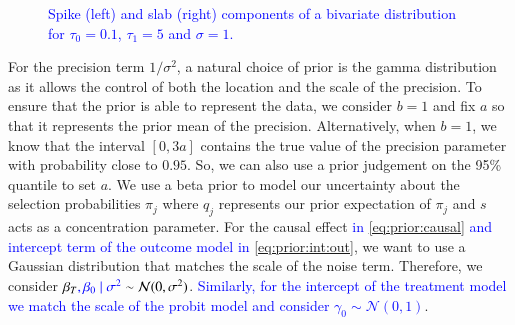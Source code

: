 \documentclass[preprint,12pt]{elsarticle}
\newcommand{\normal}{\mathcal{N}}
\newcommand{\added}[1]{\textcolor{blue}{#1}}
\begin{document}
\begin{figure}[h]
	\begin{center}
\qquad
{}
	\end{center}
	\caption{\added{Spike (left) and slab (right) components of a bivariate distribution for $\tau_0 = 0.1$, $\tau_1 = 5$ and $\sigma=1$.}}
	\label{fig:ssbl}
\end{figure}

For the precision term $1/\sigma^2$, a natural choice of prior is the gamma distribution
as it allows the control of both the location and the scale of the precision.
To ensure that the prior is able to represent the data, we consider $b=1$ and 
fix $a$ so that it represents the prior mean of the precision.
Alternatively, when $b=1$, we know that the interval
$[0, 3a]$ contains the true value of the precision parameter with probability close to $0.95$.
So, we can also use a prior judgement on the 95\% quantile to set $a$.
We use a beta prior to
model our uncertainty about
the selection probabilities $\pi_j$ where  $q_j$ represents our prior expectation of $\pi_j$ and $s$ acts as 
a concentration parameter.
For the causal effect \added{in \cref{eq:prior:causal} and intercept term of the outcome model in \cref{eq:prior:int:out}}, we want to use a Gaussian distribution that 
matches the scale of the noise term. Therefore, we consider $\beta_T\added{, \beta_0\mid\sigma^2}\sim \normal(0,\sigma^2)$. \added{Similarly, for the intercept of the treatment model we match the scale of the probit model and consider $\gamma_0\sim \mathcal{N}(0,1)$}.
\end{document}

